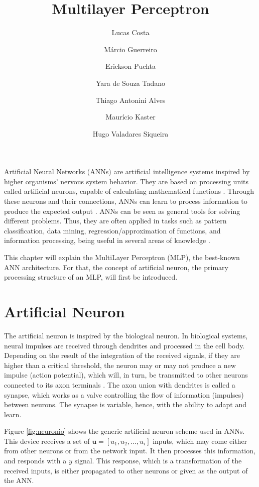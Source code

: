 \title{Multilayer Perceptron}
\label{chp:multilayer-perceptron}
\author{Lucas Costa \and Márcio Guerreiro \and Erickson Puchta \and Yara de Souza Tadano \and Thiago Antonini Alves \and  Maurício Kaster \and Hugo Valadares Siqueira}
\institute{}
\maketitle

Artificial Neural Networks (ANNs) are artificial intelligence systems inspired by higher organisms' nervous system behavior. They are based on processing units called artificial neurons, capable of calculating mathematical functions \cite{haykin}. Through these neurons and their connections, ANNs can learn to process information to produce the expected output \cite{Castro2006FundamentalsON}. ANNs can be seen as general tools for solving different problems. Thus, they are often applied in tasks such as pattern classification, data mining, regression/approximation of functions, and information processing, being useful in several areas of knowledge \cite{haykin}.

This chapter will explain the MultiLayer Perceptron (MLP), the best-known ANN architecture.  For that, the concept of artificial neuron, the primary processing structure of an MLP, will first be introduced.

\section{Artificial Neuron}
\label{sec:neuronio}

The artificial neuron is inspired by the biological neuron. In biological systems, neural impulses are received through dendrites and processed in the cell body. Depending on the result of the integration of the received signals, if they are higher than a critical threshold, the neuron may or may not produce a new impulse (action potential), which will, in turn, be transmitted to other neurons connected to its axon terminals \cite{Castro2006FundamentalsON}. The axon union with dendrites is called a synapse, which works as a valve controlling the flow of information (impulses) between neurons. The synapse is variable, hence, with the ability to adapt and learn.

Figure \ref{fig:neuronio} shows the generic artificial neuron scheme used in ANNs. This device receives a set of $\textbf{u} = [ u_1 , u_2 ,..., u_i]$ inputs, which may come either from other neurons or from the network input. It then processes this information, and responds with a $y$ signal. This response, which is a transformation of the received inputs, is either propagated to other neurons or given as the output of the ANN.

